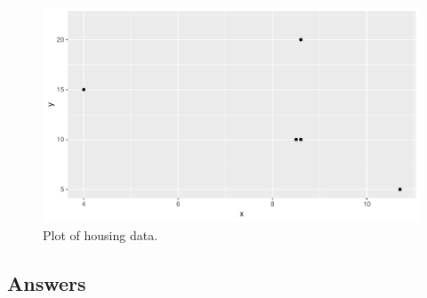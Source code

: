 \documentclass[]{book}\usepackage[]{graphicx}\usepackage[]{color}
\makeatletter
\def\maxwidth{ %
  \ifdim\Gin@nat@width>\linewidth
    \linewidth
  \else
    \Gin@nat@width
  \fi
}
\newenvironment{knitrout}{}{} %
\makeatother
\begin{document}
\begin{enumerate}
\begin{knitrout}
\begin{figure}
{\centering \includegraphics[width=\maxwidth]{figure/lm_16-1} 

}

\caption[Plot of housing data]{Plot of housing data.}\label{fig:lm_16}
\end{figure}


\end{knitrout}


\end{enumerate}

\subsection{Answers}
\end{document}
